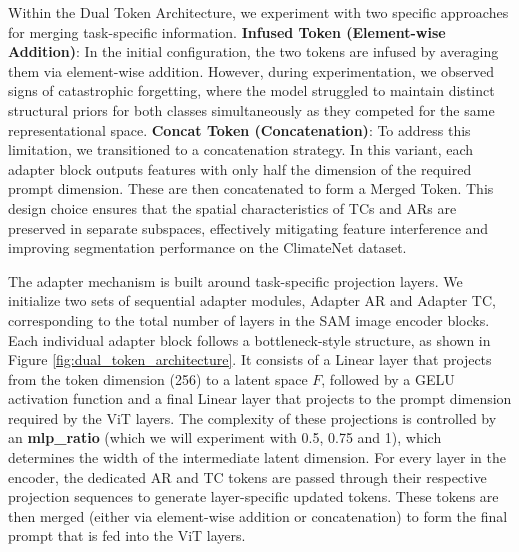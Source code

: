 Within the Dual Token Architecture, we experiment with two specific approaches for merging task-specific information. \textbf{Infused Token (Element-wise Addition)}: In the initial configuration, the two tokens are infused by averaging them via element-wise addition. However, during experimentation, we observed signs of catastrophic forgetting, where the model struggled to maintain distinct structural priors for both classes simultaneously as they competed for the same representational space. \textbf{Concat Token (Concatenation)}: To address this limitation, we transitioned to a concatenation strategy. In this variant, each adapter block outputs features with only half the dimension of the required prompt dimension. These are then concatenated to form a Merged Token. This design choice ensures that the spatial characteristics of TCs and ARs are preserved in separate subspaces, effectively mitigating feature interference and improving segmentation performance on the ClimateNet dataset.

The adapter mechanism is built around task-specific projection layers. We initialize two sets of sequential adapter modules, Adapter AR and Adapter TC, corresponding to the total number of layers in the SAM image encoder blocks. Each individual adapter block follows a bottleneck-style structure, as shown in Figure \ref{fig:dual_token_architecture}. It consists of a Linear layer that projects from the token dimension (256) to a latent space $F$, followed by a GELU activation function and a final Linear layer that projects to the prompt dimension required by the ViT layers. The complexity of these projections is controlled by an \textbf{mlp\_ratio} (which we will experiment with 0.5, 0.75 and 1), which determines the width of the intermediate latent dimension.  For every layer in the encoder, the dedicated AR and TC tokens are passed through their respective projection sequences to generate layer-specific updated tokens. These tokens are then merged (either via element-wise addition or concatenation) to form the final prompt that is fed into the ViT layers.


